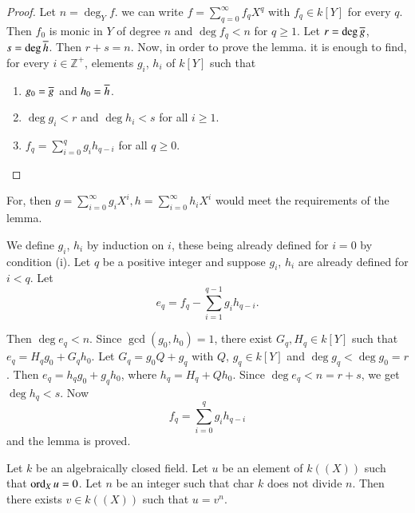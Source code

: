 \begin{proof}
  Let $n= \deg_Y f$. we can write $f = \displaystyle{\sum^\infty_{q=0} f_q X^q}$ with $f_q \in k [Y]$ for every $q$. Then $f_0$ is monic in $Y$ of degree $n$ and $\deg f_q < n$ for $q \geq 1$. Let $r= \deg \overline{g}$,\pageoriginale $s= \deg \overline{h}$. Then $r
+ s=n$. Now, in order to prove the lemma. it is enough to find, for every $i \in \mathbb{Z}^+$, elements $g_i$, $h_i$ of $k [Y]$ such that
\begin{enumerate}
\item $g_0 = \overline{g}$ and $h_0 = \overline{h}$.
\item $\deg g_i < r$ and $\deg h_i < s$ for all $i \geq 1$.
\item $f_q = \sum^q_{i=0} g_i h_{q-i}$ for all $q\geq 0$.
\end{enumerate}
\end{proof}

For, then $\displaystyle{g= \sum^\infty_{i=0} g_i X^i, h= \sum^\infty_{i=0} h_i X^i}$ would meet the requirements of the lemma.

We define $g_i$, $h_i$ by induction on $i$, these being already defined for $i=0$ by condition (i). Let $q$ be a positive integer and suppose $g_i$, $h_i$ are already defined for $i < q$. Let 
$$
e_q = f_q - \sum^{q-1}_{i=1} g_i h_{q-i}.
$$

Then $\deg e_q < n$. Since $\gcd (g_0, h_0)=1$, there exist $G_q, H_q \in k [Y]$ such that $e_q= H_q g_0 + G_q h_0$. Let $G_q = g_0 Q + g_q$ with $Q$, $g_q \in k [Y]$ and $\deg g_q < \deg g_0=r$. Then $e_q = h_q g_0 + g_q h_0$, where $h_q = H_q+ Qh_0$. Since $\deg e_q < n = r+s$, we get $\deg h_q < s$. Now
$$
f_q = \sum^q_{i=0} g_i h_{q-i}
$$
and the lemma is proved.

\setcounter{thm}{2}
\begin{coro}\label{part1:chap2:sec5:coro5.3}
  Let $k$ be an algebraically closed field. Let $u$ be an element of $k ((X))$ such that $\operatorname{ord}_X u=0$. Let $n$ be an integer such that char $k$ does not divide $n$. Then there exists $v \in k ((X))$ such that $u= v^n$.
\end{coro}

